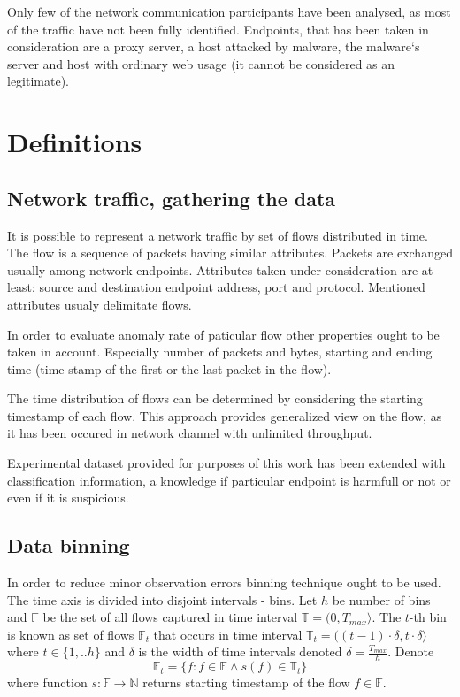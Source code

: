 \documentclass[a4paper,journal]{IEEEtran}
\begin{document}
Only few of the network communication participants have been analysed, as most of the traffic have not been fully identified. Endpoints, that has been taken in consideration are a proxy server, a host attacked by malware, the malware`s server and host with ordinary web usage (it cannot be considered as an legitimate).

\section{Definitions}
\subsection{Network traffic, gathering the data}
It is possible to represent a network traffic by set of flows distributed in time. The flow is a sequence of packets having  similar attributes. Packets are exchanged usually among network endpoints. Attributes taken under consideration are at least: source and destination endpoint address, port and protocol. Mentioned attributes usualy delimitate flows.

In order to evaluate anomaly rate of paticular flow other properties ought to be taken in account. Especially number of packets and bytes, starting and ending time (time-stamp of the first or the last packet in the flow).

The time distribution of flows can be determined by considering the starting timestamp of each flow. This approach provides generalized view on the flow, as it has been occured in network channel with unlimited throughput.

Experimental dataset provided for purposes of this work has been extended with classification information, a knowledge if particular endpoint is harmfull or not or even if it is suspicious.

\subsection{Data binning}
In order to reduce minor observation errors binning technique ought to be used. The time axis is divided into disjoint intervals - bins. Let $h$ be number of bins and $\mathbb{F}$ be the set of all flows captured in time interval $\mathbb{T} = (0, T_{max}\rangle $. The $t$-th bin is known as  set of flows $\mathbb{F}_t$ that occurs in time interval $\mathbb{T}_t = ((t-1)\cdot \delta, t\cdot \delta\rangle $ where $t \in \{1, .. h\}$ and $\delta$ is the width of time intervals denoted $\delta = \frac{T_{max}}{h}$. Denote
\begin{equation}
\mathbb{F}_t = \{f : f \in \mathbb{F} \wedge s(f) \in \mathbb{T}_t \}
\end{equation}
where function $s:\mathbb{F} \rightarrow \mathbb{N} $ 
returns starting timestamp of the flow $f\in \mathbb{F}$.
\end{document}
